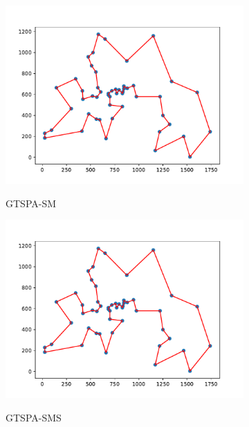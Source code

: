 \documentclass[12pt]{article}
\theoremstyle{plain}
\theoremstyle{definition}
\theoremstyle{remark}
\begin{document}
\begin{figure}[ht]
	\begin{subfigure}{.5\textwidth}
		\centering
		\includegraphics[scale = 0.44]{../../Implementation/gen/best_path_gtspasm_berlin52}
		\label{fig:best_path_gtspasm_berlin52}
		\caption{GTSPA-SM}
	\end{subfigure}%
	\begin{subfigure}{.5\textwidth}
		\centering
		\includegraphics[scale = 0.44]{../../Implementation/gen/best_path_gtspasms_berlin52}
		\label{fig:best_path_gtspasms_berlin52}
		\caption{GTSPA-SMS}
	\end{subfigure}
	\begin{subfigure}{.5\textwidth}
		\centering

\end{subfigure}
\end{figure}
\end{document}

